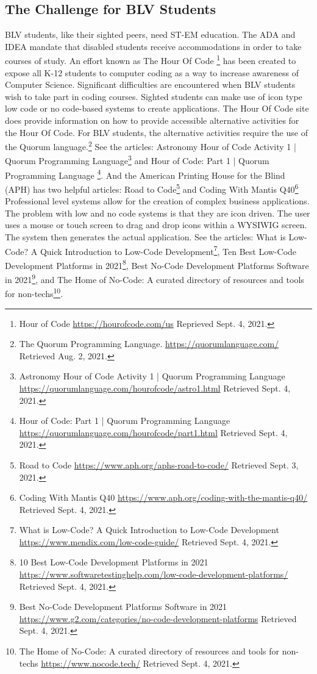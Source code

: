 \documentclass[11.5pt]{sig-alternate}
\begin{document}
\begin{large}
\section*{The Challenge for BLV Students}
BLV students, like their sighted peers, need ST-EM education. The ADA and IDEA mandate that disabled students receive accommodations in order to take courses of study. An effort known as The Hour Of Code \footnote{Hour of Code \url{https://hourofcode.com/us} Reprieved Sept. 4, 2021.} has been created to expose all K-12 students to computer coding as a way to increase awareness of Computer Science. Significant difficulties are encountered when BLV students wish to take part in coding courses. Sighted students can make use of icon type low code or no code-based systems to create applications. The Hour Of Code site does provide information on how to provide accessible alternative activities for the Hour Of Code. For BLV students, the alternative activities require the use of the Quorum language.\footnote{The Quorum Programming Language. \url{https://quorumlanguage.com/} Retrieved Aug. 2, 2021.} See the articles: Astronomy Hour of Code Activity 1 | Quorum Programming Language\footnote{Astronomy Hour of Code Activity 1 | Quorum Programming Language \url{https://quorumlanguage.com/hourofcode/astro1.html} Retrieved Sept. 4, 2021.} and Hour of Code: Part 1 | Quorum Programming Language \footnote{Hour of Code: Part 1 | Quorum Programming Language \url{https://quorumlanguage.com/hourofcode/part1.html} Retrieved Sept. 4, 2021.}. And the American Printing House for the Blind (APH) has two helpful articles: Road to Code\footnote{Road to Code \url{https://www.aph.org/aphs-road-to-code/} Retrieved Sept. 3, 2021.} and Coding With Mantis Q40\footnote{Coding With Mantis Q40 \url{https://www.aph.org/coding-with-the-mantis-q40/} Retrieved Sept. 4, 2021.} Professional level systems allow for the creation of complex business applications. The problem with low and no code systems is that they are icon driven. The user uses a mouse or touch screen to drag and drop icons within a WYSIWIG screen. The system then generates the actual application. See the articles: What is Low-Code? A Quick Introduction to Low-Code Development\footnote{What is Low-Code? A Quick Introduction to Low-Code Development \url{https://www.mendix.com/low-code-guide/} Retrieved Sept. 4, 2021.}, Ten Best Low-Code Development Platforms in 2021\footnote{10 Best Low-Code Development Platforms in 2021 \url{https://www.softwaretestinghelp.com/low-code-development-platforms/} Retrieved Sept. 4, 2021.}, Best No-Code Development Platforms Software in 2021\footnote{Best No-Code Development Platforms Software in 2021 \url{https://www.g2.com/categories/no-code-development-platforms} Retrieved Sept. 4, 2021.}, and The Home of No-Code: A curated directory of resources and tools for non-techs\footnote{The Home of No-Code: A curated directory of resources and tools for non-techs \url{https://www.nocode.tech/} Retrieved Sept. 4, 2021.}.
\\

\end{large}
\end{document}
